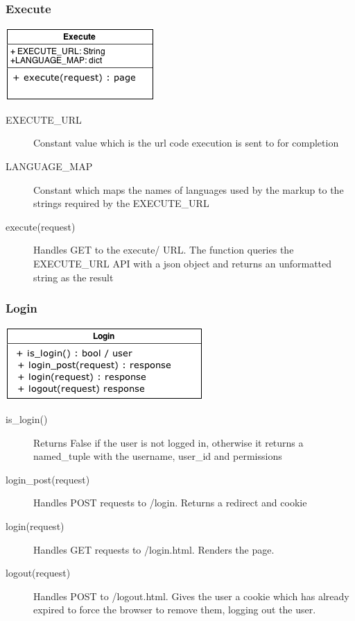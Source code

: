 \documentclass[12pt]{scrartcl}
\begin{document}
\subsubsection{Execute}
\includegraphics[keepaspectratio]{umls/execute_uml.png}
\begin{description}
\item [EXECUTE\_URL] Constant value which is the url code execution is sent to for completion
\item [LANGUAGE\_MAP] Constant which maps the names of languages used by the markup to the strings required by the EXECUTE\_URL
\item[execute(request)] Handles GET to the execute/ URL. The function queries the EXECUTE\_URL API with a json object and returns an unformatted string as the result
\end{description}

\subsubsection{Login}
\includegraphics[keepaspectratio]{umls/login_uml.png}
\begin{description}
\item [is\_login()] Returns False if the user is not logged in, otherwise it returns a named\_tuple with the username, user\_id and permissions
\item [login\_post(request)] Handles POST requests to /login. Returns a redirect  and cookie
\item [login(request)] Handles GET requests to /login.html. Renders the page.
\item [logout(request)] Handles POST to /logout.html. Gives the user a cookie which has already expired to force the browser to remove them, logging out the user.
\end{description}
\end{document}
